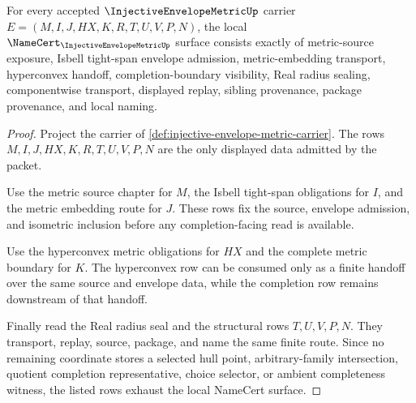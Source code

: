 \begin{theorem}
\label{thm:injective-envelope-metric-namecert-obligations}
For every accepted $\InjectiveEnvelopeMetricUp$ carrier $E=(M,I,J,HX,K,R,T,U,V,P,N)$, the local $\NameCert_{\InjectiveEnvelopeMetricUp}$ surface consists exactly of metric-source exposure, Isbell tight-span envelope admission, metric-embedding transport, hyperconvex handoff, completion-boundary visibility, Real radius sealing, componentwise transport, displayed replay, sibling provenance, package provenance, and local naming.
\end{theorem}
\begin{proof}
Project the carrier of \autoref{def:injective-envelope-metric-carrier}. The rows $M,I,J,HX,K,R,T,U,V,P,N$ are the only displayed data admitted by the packet.

Use the metric source chapter for $M$, the Isbell tight-span obligations for $I$, and the metric embedding route for $J$. These rows fix the source, envelope admission, and isometric inclusion before any completion-facing read is available.

Use the hyperconvex metric obligations for $HX$ and the complete metric boundary for $K$. The hyperconvex row can be consumed only as a finite handoff over the same source and envelope data, while the completion row remains downstream of that handoff.

Finally read the Real radius seal and the structural rows $T,U,V,P,N$. They transport, replay, source, package, and name the same finite route. Since no remaining coordinate stores a selected hull point, arbitrary-family intersection, quotient completion representative, choice selector, or ambient completeness witness, the listed rows exhaust the local NameCert surface.
\end{proof}

